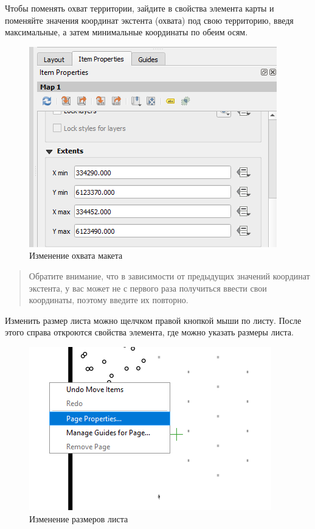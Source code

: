 \documentclass[
  12pt,
]{book}
\begin{document}
Чтобы поменять охват территории, зайдите в свойства элемента карты и поменяйте значения координат экстента (охвата) под свою территорию, введя максимальные, а затем минимальные координаты по обеим осям.

\begin{figure}
\centering
\includegraphics{images/Practice/Extent.png}
\caption{Изменение охвата макета}
\end{figure}

\begin{quote}
Обратите внимание, что в зависимости от предыдущих значений координат экстента, у вас может не с первого раза получиться ввести свои координаты, поэтому введите их повторно.
\end{quote}

Изменить размер листа можно щелчком правой кнопкой мыши по листу. После этого справа откроются свойства элемента, где можно указать размеры листа.

\begin{figure}
\centering
\includegraphics{images/Practice/Layout_size.png}
\caption{Изменение размеров листа}
\end{figure}
\end{document}
